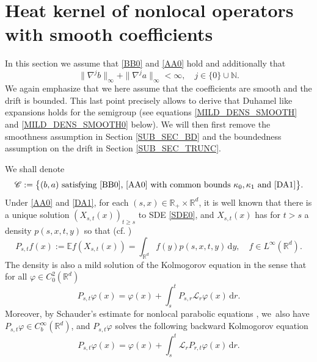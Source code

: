 \documentclass[11pt]{article}
\numberwithin{equation}{section}\providecommand{\asymp}{\mathrel{\sim}}
\theoremstyle{plain}
\theoremstyle{definition}
\newcommand\mE{\mathbb{E}}
\newcommand\mN{\mathbb{N}}
\newcommand\mR{\mathbb{R}}
\newcommand\1{{\mathbf{1}}}
\newcommand\sC{{\mathscr C}}
\newcommand{\dif}{\,\mathrm{d}}
\begin{document}
\section{Heat kernel of nonlocal operators with smooth coefficients}
\label{SEC_HK_SMOOTH_COEFF}
In this section we assume that \eqref{BB0} and \eqref{AA0} hold and additionally that
\begin{equation}\label{DA1}
\|\nabla^jb\|_\infty+\|\nabla^ja\|_\infty<\infty,\quad j\in\{0\}\cup\mN.
\end{equation}
We again emphasize that we here assume that the coefficients are smooth and the drift is bounded. This last point precisely allows to derive that Duhamel like expansions holds for the semigroup (see equations \eqref{MILD_DENS_SMOOTH} and \eqref{MILD_DENS_SMOOTH0} below). We will then first remove the smoothness assumption in Section \ref{SUB_SEC_BD} and the boundedness assumption on the drift in Section \ref{SUB_SEC_TRUNC}.

We shall denote
\[
\sC:=\big\{(b,a) \text{ satisfying \eqref{BB0}, \eqref{AA0} with common bounds $\kappa_0,\kappa_1$ and \eqref{DA1}}\big\}.
\]
Under \eqref{AA0} and \eqref{DA1},
for each $(s,x)\in\mR_+\times\mR^d$,
it is well known that there is a unique solution $(X_{s,t}(x))_{t\geq s}$ to SDE \eqref{SDE0},
and $X_{s,t}(x)$ has for $t>s$ a density $p(s,x,t,y)$ so that (cf. \cite{De-Fo, CHZ})\vspace*{-3pt}
\[
P_{s,t} f(x):=\mE f(X_{s,t}(x))=\int_{\mR^d}f(y)p(s,x,t,y)\dif y,\quad f\in L^\infty(\mR^d).
\]
The density is also a mild solution of the Kolmogorov equation in the sense that for all $\varphi\in C_0^2(\mR^d) $\vspace*{-3pt}
\begin{equation}
\label{MILD_DENS_SMOOTH}
P_{s,t} \varphi(x)=\varphi(x)+\int_s^t P_{s,r}\mathscr L_r \varphi (x)\dif r.
\end{equation}
Moreover, by Schauder's estimate for nonlocal parabolic equations \cite[Th.\,3.5]{Zh-Zh}, we~also have $P_{s,t}\varphi\in C^\infty_b(\mR^d)$, and
$P_{s,t}\varphi$ solves the following backward Kolmogorov equation\vspace*{-3pt}
\begin{equation}
\label{MILD_DENS_SMOOTH0}
P_{s,t} \varphi(x)=\varphi(x)+\int_s^t\mathscr L_r P_{r,t}\varphi (x)\dif r.
\end{equation}
\end{document}
